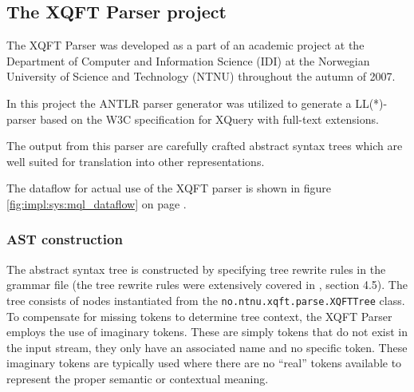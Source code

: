 \subsection{The XQFT Parser project}
\label{sect:theory:xqftparser}
The XQFT Parser\cite{ourselves} was developed as a part of an academic project
at the Department of Computer and Information Science (IDI) at the Norwegian
University of Science and Technology (NTNU) throughout the autumn of 2007.

In this project the ANTLR parser generator was utilized to generate a
LL(*)-parser based on the W3C specification\cite{w3c01} for XQuery with
full-text extensions.

The output from this parser are carefully crafted abstract syntax trees which
are well suited for translation into other representations.

% 

The dataflow for actual use of the XQFT parser is shown in figure
\ref{fig:impl:sys:mql_dataflow} on page \pageref{fig:impl:sys:mql_dataflow}.

\subsubsection{AST construction}
\label{sect:theory:xqftparser:ast_construction}
The abstract syntax tree is constructed by specifying tree rewrite rules in the
grammar file (the tree rewrite rules were extensively covered in \cite{ourselves}, section
4.5). The tree consists of nodes instantiated from the
\verb!no.ntnu.xqft.parse.XQFTTree! class. To compensate for missing tokens to
determine tree context, the XQFT Parser employs the use of imaginary tokens.
These are simply tokens that do not exist in the input stream, they only have
an associated name and no specific token. These imaginary tokens are typically
used where there are no ``real'' tokens available to represent the proper
semantic or contextual meaning.

